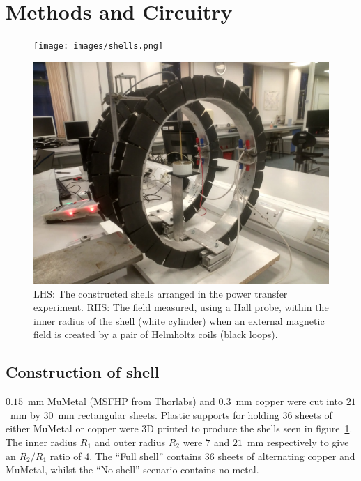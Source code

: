\documentclass[11pt]{iopart}
\begin{document}
\section{Methods and Circuitry}
\begin{figure}
\begin{center}
    \begin{minipage}{0.315\textwidth}
        \noindent\texttt{[image: images/shells.png]}
    \end{minipage}
    \begin{minipage}{0.553\textwidth}
        \noindent\includegraphics[width=\linewidth]{images/helm.png}
    \end{minipage}
\caption{LHS: The constructed shells arranged in the power transfer
  experiment. RHS: The field measured, using a Hall probe, within the
  inner radius of the shell (white cylinder) when an external magnetic
  field is created by a pair of Helmholtz coils (black loops).}
\label{fig:shells}
\end{center}
\end{figure}

\subsection{Construction of shell}
$0.15$~mm MuMetal (MSFHP from Thorlabs) and $0.3$~mm copper were cut
into $21$~mm by $30$~mm rectangular sheets.  Plastic supports for
holding $36$ sheets of either MuMetal or copper were 3D printed to
produce the shells seen in figure~\ref{fig:shells}. The inner radius
$R_1$ and outer radius $R_2$ were $7$ and $21$~mm respectively to give
an $R_2/R_1$ ratio of 4. The ``Full shell'' contains $36$ sheets of
alternating copper and MuMetal, whilst the ``No shell'' scenario
contains no metal. \\
\end{document}
